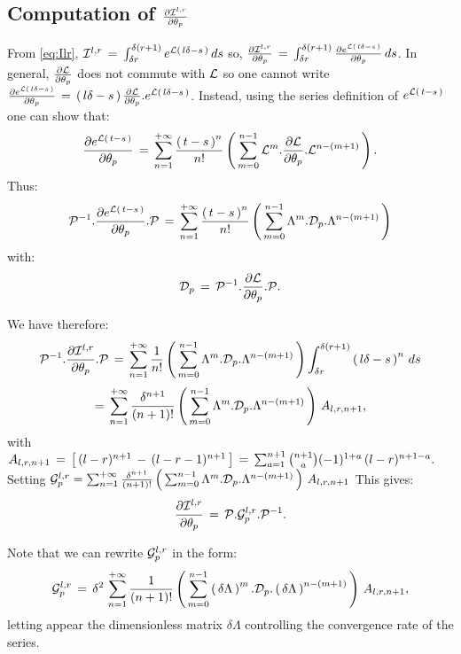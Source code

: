 \documentclass{article}
\begin{document}
\subsection{Computation of $\frac{\partial {\mathcal I}^{l,r}}{\partial \theta_p}$}\label{Sec:dIdtheta}

From \eqref{eq:Ilr}, 
${\mathcal I}^{l,r}\,=\,\int_{\delta r}^{\delta (r+1)} e^{{\mathcal L}\left(\, l \delta - s \, \right)} \,ds$
%
so, $\frac{\partial {\mathcal I}^{l,r}}{\partial \theta_p}\,=\, \int_{\delta r}^{\delta (r+1)} \frac{\partial e^{{\mathcal L}\left(\, l \delta - s \, \right)}}{\partial \theta_p} \,ds$. In general, $\frac{\partial  {\mathcal L}}{\partial \theta_p}$ does not commute with ${\mathcal L}$  so one cannot write $\frac{\partial e^{{\mathcal L}\left(\, l \delta - s \, \right)}}{\partial \theta_p}\,=\,\left(\, l \delta - s \, \right) \frac{\partial {\mathcal L}}{\partial \theta_p}.e^{{\mathcal L}\left(\, l \delta - s \, \right)}$. Instead, using the series definition of $e^{{\mathcal L}\left(\, t - s \, \right)}$ one can show that:
%
$$
\frac{\partial e^{{\mathcal L}\left(\, t - s \, \right)}}{\partial \theta_p} \,=\, \sum_{n=1}^{+\infty} \frac{\left(\, t - s \, \right)^n}{n!} \left(\, \sum_{m=0}^{n-1} {\mathcal L}^m.\frac{\partial  {\mathcal L}}{\partial \theta_p}.{\mathcal L}^{n-(m+1)} \, \right).
$$
%
Thus:
%
$$
{\mathcal P}^{-1}.\frac{\partial e^{{\mathcal L}\left(\, t - s \, \right)}}{\partial \theta_p}.{\mathcal P}\,=\, \sum_{n=1}^{+\infty} \frac{\left(\, t - s \, \right)^n}{n!} \left(\, \sum_{m=0}^{n-1} \Lambda^m.{\mathcal D}_p.\Lambda^{n-(m+1)} \, \right)
$$
%
with:
%
\begin{equation}\label{eq:Dp}
{\mathcal D}_p\,=\,{\mathcal P}^{-1}.\frac{\partial  {\mathcal L}}{\partial \theta_p}.{\mathcal P}.
\end{equation}

We have therefore:
%
$$
{\mathcal P}^{-1}.\frac{\partial {\mathcal I}^{l,r}}{\partial \theta_p}.{\mathcal P} \,=\, \sum_{n=1}^{+\infty} \frac{1}{n!} \left(\, \sum_{m=0}^{n-1} \Lambda^m.{\mathcal D}_p.\Lambda^{n-(m+1)} \, \right) \int_{\delta r}^{\delta (r+1)} \left(\, l \delta - s \, \right)^n\,ds 
$$
%
$$
=\,\sum_{n=1}^{+\infty} \frac{\delta^{n+1}}{(n+1)!} \left(\, \sum_{m=0}^{n-1} \Lambda^m.{\mathcal D}_p.\Lambda^{n-(m+1)} \, \right) \,A_{l,r,n+1},
$$
%
with $A_{l,r,n+1} \,=\,\left[\, (l-r)^{n+1} \,-\,(l-r-1)^{n+1} \, \right] \,=\, \sum_{a=1}^{n+1} \binom{n+1}{a} (-1)^{1+a} \, (l-r)^{n+1-a}.$
%
Setting ${\mathcal G}^{l,r}_p=\sum_{n=1}^{+\infty} \frac{\delta^{n+1}}{(n+1)!} \left(\, \sum_{m=0}^{n-1} \Lambda^m.{\mathcal D}_p.\Lambda^{n-(m+1)} \, \right) \,A_{l,r,n+1}$
This gives:
%
\begin{equation}\label{eq:dIdtheta}
\frac{\partial {\mathcal I}^{l,r}}{\partial \theta_p} \,=\,
{\mathcal P}.{\mathcal G}^{l,r}_p.{\mathcal P}^{-1}.
\end{equation}

Note that we can rewrite ${\mathcal G}^{l,r}_p$ in the form:
%
$$
{\mathcal G}^{l,r}_p\,=\,\delta^{2} \,\sum_{n=1}^{+\infty} \frac{1}{(n+1)!} \left(\, \sum_{m=0}^{n-1} \left(\, \delta\Lambda \, \right)^m.{\mathcal D}_p.\left(\, \delta\Lambda \, \right)^{n-(m+1)} \, \right) \,A_{l,r,n+1},
$$
%
letting appear the dimensionless matrix $\delta\Lambda$ controlling the convergence rate of the series.
\end{document}
